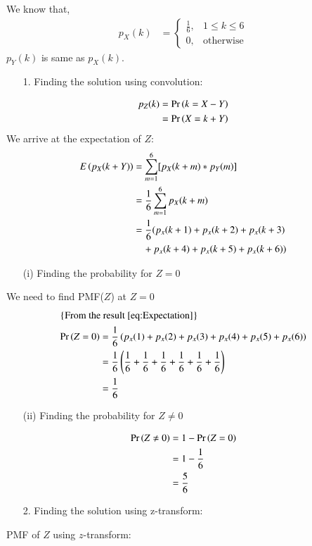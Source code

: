 \documentclass[journal,12pt,twocolumn]{IEEEtran}
\theoremstyle{remark}
\begin{document}
We know that,
\begin{align}
p_X(k) &= 
	\begin{cases}
		\frac{1}{6}, & 1 \leq k \leq 6 \\
		0, & \text{otherwise}
	\end{cases}
\end{align}
$p_Y(k)$ is same as $p_X(k)$.
\begin{enumerate}
\item[1.] Finding the solution using convolution:
\end{enumerate}
\begin{align}
p_Z(k) &= \Pr\left(k = X-Y\right)\\
&= \Pr\left(X = k+Y\right)
\end{align}
We arrive at the expectation of $Z$: 
\begin{align}
E\left(p_X(k+Y)\right) &= \sum^{6}_{m=1}[p_X(k+m)*p_Y(m)]\\
&= \frac{1}{6}\sum^6_{m=1} p_X(k+m)\\
&= \frac{1}{6}(p_x(k+1)+p_x(k+2)+p_x(k+3) \nonumber \\ &\quad +p_x(k+4)+p_x(k+5)+p_x(k+6)) \label{eq:Expectation}
\end{align}
\begin{enumerate}
\item[(i)] Finding the probability for $Z = 0$
\end{enumerate}
We need to find PMF($Z$) at $Z = 0$
\begin{align}
	\intertext{\{From the result \eqref{eq:Expectation}\}}
	\Pr\left(Z=0\right) &= \frac{1}{6}\left(p_x(1)+p_x(2)+p_x(3)+p_x(4)+p_x(5)+p_x(6)\right)\\
	&= \frac{1}{6}\left(\frac{1}{6}+\frac{1}{6}+\frac{1}{6}+\frac{1}{6}+\frac{1}{6}+\frac{1}{6}\right)\\
	&= \frac{1}{6}	
\end{align}
\begin{enumerate}
\item[(ii)] Finding the probability for $Z \neq 0$
\end{enumerate}
\begin{align}
	\Pr\left(Z \neq 0\right) &= 1-\Pr\left(Z=0\right)\\
	&= 1-\frac{1}{6}\\
	&= \frac{5}{6}
\end{align}
\begin{enumerate}
\item[2.] Finding the solution using z-transform:
\end{enumerate}
PMF of $Z$ using $z$-transform:
\end{document}
